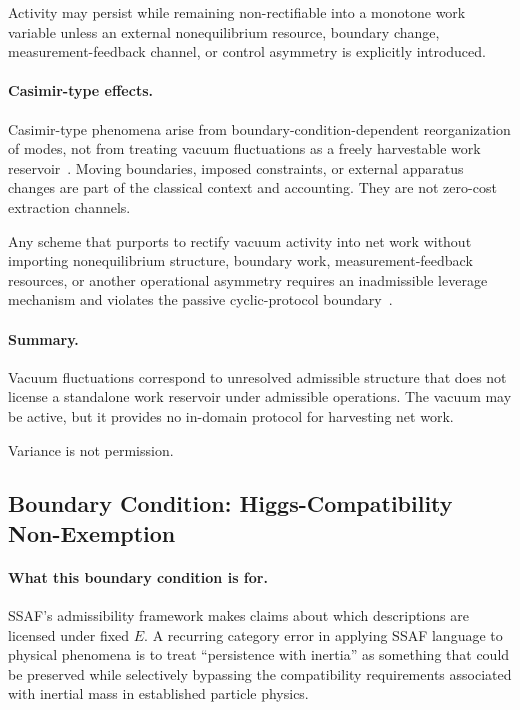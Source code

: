 \documentclass[aps,prx,onecolumn,11pt]{revtex4-2}
\theoremstyle{plain}
\theoremstyle{definition}
\theoremstyle{remark}
\begin{document}
Activity may persist while remaining non-rectifiable into a monotone
work variable unless an external nonequilibrium resource, boundary
change, measurement-feedback channel, or control asymmetry is explicitly
introduced.

\paragraph{Casimir-type effects.}

Casimir-type phenomena arise from boundary-condition-dependent
reorganization of modes, not from treating vacuum fluctuations as a
freely harvestable work reservoir~\cite{Casimir1948}. Moving
boundaries, imposed constraints, or external apparatus changes are part
of the classical context and accounting. They are not zero-cost
extraction channels.

Any scheme that purports to rectify vacuum activity into net work
without importing nonequilibrium structure, boundary work,
measurement-feedback resources, or another operational asymmetry
requires an inadmissible leverage mechanism and violates the passive
cyclic-protocol boundary~\cite{Pusz1978,Lenard1978}.

\paragraph{Summary.}

Vacuum fluctuations correspond to unresolved admissible structure that
does not license a standalone work reservoir under admissible
operations. The vacuum may be active, but it provides no in-domain
protocol for harvesting net work.

Variance is not permission.

\subsection{Boundary Condition: Higgs-Compatibility Non-Exemption}
\label{subsec:higgs_boundary}

\paragraph{What this boundary condition is for.}

SSAF's admissibility framework makes claims about which descriptions are
licensed under fixed \(E\). A recurring category error in applying SSAF
language to physical phenomena is to treat ``persistence with inertia''
as something that could be preserved while selectively bypassing the
compatibility requirements associated with inertial mass in established
particle physics.
\end{document}

